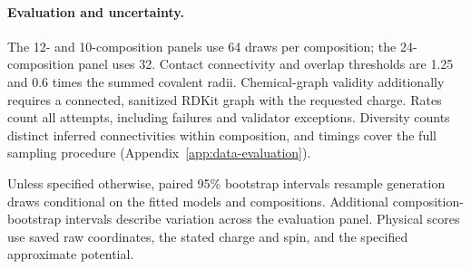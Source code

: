 \paragraph{Evaluation and uncertainty.}
The 12- and 10-composition panels use 64 draws per composition; the 24-composition panel uses 32. Contact connectivity and overlap thresholds are 1.25 and 0.6 times the summed covalent radii. Chemical-graph validity additionally requires a connected, sanitized RDKit graph with the requested charge. Rates count all attempts, including failures and validator exceptions. Diversity counts distinct inferred connectivities within composition, and timings cover the full sampling procedure (Appendix~\ref{app:data-evaluation}).

Unless specified otherwise, paired 95\% bootstrap intervals resample generation draws conditional on the fitted models and compositions. Additional composition-bootstrap intervals describe variation across the evaluation panel. Physical scores use saved raw coordinates, the stated charge and spin, and the specified approximate potential.
